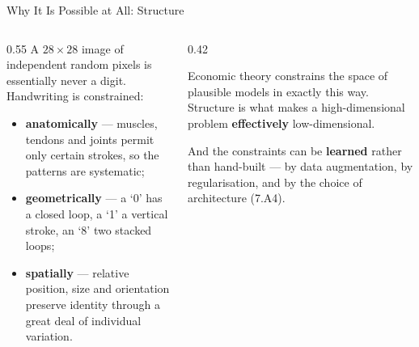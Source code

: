 \begin{frame}{Why It Is Possible at All: Structure}
\begin{columns}[T]
\begin{column}{0.55\textwidth}
\small
A $28\times28$ image of independent random pixels is essentially never a digit. Handwriting is constrained:
\medskip
\begin{itemize}\small\setlength{\itemsep}{1.2mm}
  \item \textbf{anatomically} --- muscles, tendons and joints permit only certain strokes, so the patterns are systematic;
  \item \textbf{geometrically} --- a `0' has a closed loop, a `1' a vertical stroke, an `8' two stacked loops;
  \item \textbf{spatially} --- relative position, size and orientation preserve identity through a great deal of individual variation.
\end{itemize}
\end{column}
\begin{column}{0.42\textwidth}
\begin{takeawaybox}[title=\textbf{The economist's version}]\small
Economic theory constrains the space of plausible models in exactly this way. Structure is what makes a high-dimensional problem \textbf{effectively} low-dimensional.
\end{takeawaybox}
\medskip
\begin{conceptbox}\footnotesize
And the constraints can be \textbf{learned} rather than hand-built --- by data augmentation, by regularisation, and by the choice of architecture (7.A4).
\end{conceptbox}
\end{column}
\end{columns}
\end{frame}


